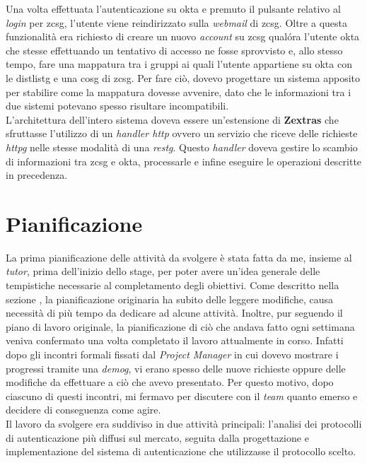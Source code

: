 Una volta effettuata l'autenticazione su \gls{okta} e premuto il pulsante relativo al \textit{login} per \gls{zcsg}, l'utente viene reindirizzato sulla \textit{webmail} di \gls{zcsg}.
Oltre a questa funzionalità era richiesto di creare un nuovo \textit{account} su \gls{zcsg} qualóra l'utente \gls{okta} che stesse effettuando un tentativo di accesso ne fosse sprovvisto e, allo stesso tempo, fare una mappatura tra i gruppi ai quali l'utente appartiene su \gls{okta} con le \gls{distlistg} e una \gls{cosg} di \gls{zcsg}. Per fare ciò, dovevo progettare un sistema apposito per stabilire come la mappatura dovesse avvenire, dato che le informazioni tra i due sistemi potevano spesso risultare incompatibili. \\
L'architettura dell'intero sistema doveva essere un'estensione di \textbf{Zextras} che sfruttasse l'utilizzo di un \textit{handler http} ovvero un servizio che riceve delle richieste \textit{\gls{httpg}} nelle stesse modalità di una \textit{\gls{restg}}. Questo \textit{handler} doveva gestire lo scambio di informazioni tra \gls{zcsg} e \gls{okta}, processarle e infine eseguire le operazioni descritte in precedenza.

\section{Pianificazione}
La prima pianificazione delle attività da svolgere è stata fatta da me, insieme al \textit{tutor}, prima dell'inizio dello stage, per poter avere un'idea generale delle tempistiche necessarie al completamento degli obiettivi. Come descritto nella sezione , la pianificazione originaria ha subito delle leggere modifiche, causa necessità di più tempo da dedicare ad alcune attività. Inoltre, pur seguendo il piano di lavoro originale, la pianificazione di ciò che andava fatto ogni settimana veniva confermato una volta completato il lavoro attualmente in corso.
Infatti dopo gli incontri formali fissati dal \textit{Project Manager} in cui dovevo mostrare i progressi tramite una \textit{\gls{demog}}, vi erano spesso delle nuove richieste oppure delle modifiche da effettuare a ciò che avevo presentato. Per questo motivo, dopo ciascuno di questi incontri, mi fermavo per discutere con il \textit{team} quanto emerso e decidere di conseguenza come agire. \\
Il lavoro da svolgere era suddiviso in due attività principali: l'analisi dei protocolli di autenticazione più diffusi sul mercato, seguita dalla progettazione e implementazione del sistema di autenticazione che utilizzasse il protocollo scelto.
